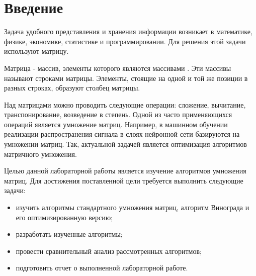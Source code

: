 \chapter*{Введение}

Задача удобного представления и хранения информации возникает в математике, физике, экономике, статистике и программировании. Для решения этой задачи используют матрицу.

Матрица - массив, элементы которого являются массивами \cite{virt}. Эти массивы называют строками матрицы. Элементы, стоящие на одной и той же позиции в разных строках, образуют столбец матрицы.

Над матрицами можно проводить следующие операции: сложение, вычитание, транспонирование, возведение в степень. Одной из часто применяющихся операций является умножение матриц. Например, в машинном обучении реализации распространения сигнала в слоях нейронной сети базируются на умножении матриц. Так, актуальной задачей является оптимизация алгоритмов матричного умножения.

Целью данной лабораторной работы является изучение алгоритмов умножения матриц. Для достижения поставленной цели требуется выполнить следующие задачи:

\begin{itemize}
	\item изучить алгоритмы стандартного умножения матриц, алгоритм Винограда и его оптимизированную версию;
	\item разработать изученные алгоритмы;
	\item провести сравнительный анализ рассмотренных алгоритмов;
	\item подготовить отчет о выполненной лабораторной работе.
\end{itemize}